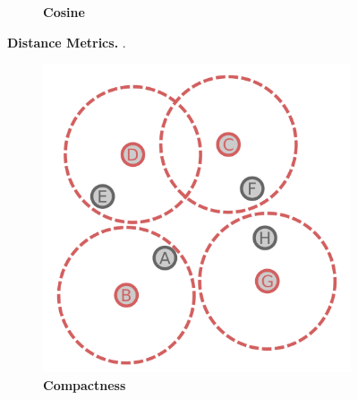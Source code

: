 \begin{figure}
\begin{adjustbox}{minipage=\dimexpr{}\fboxrule,fbox}
\begin{subfigure}[b]{0.475\textwidth}
            \caption[Cosine]{\textbf{Cosine}}
            \label{fig:1.0.2b}
        \end{subfigure}
    \end{adjustbox}
    \caption[Distance Metrics]{\textbf{Distance Metrics.} .}
    \label{fig:1.0.2}
\end{figure}

\begin{figure}
    \begin{adjustbox}{minipage=\dimexpr{}\fboxrule,fbox}
        \begin{subfigure}[b]{0.475\textwidth}
            \includegraphics[width=\textwidth]{Extra_Graphics/Compactness.pdf}
            \caption[Compactness]{\textbf{Compactness}}
            \label{fig:1.0.3a}
        \end{subfigure}
        \hfill
        \begin{subfigure}[b]{0.475\textwidth}

\end{subfigure}
\end{adjustbox}
\end{figure}
